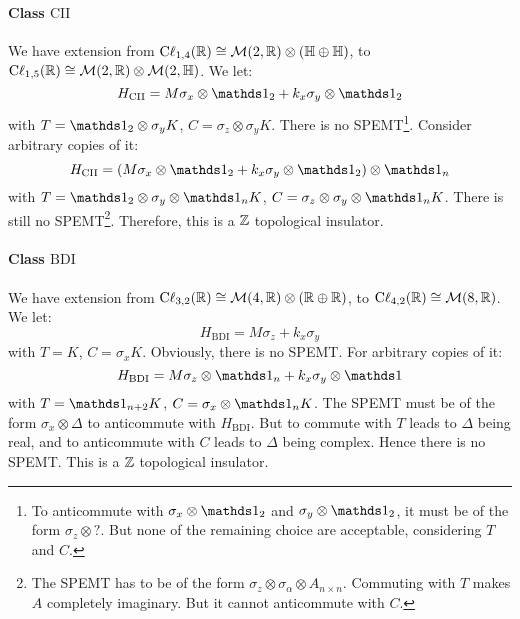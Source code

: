 \documentclass{article}
\begin{document}
\paragraph{Class $\mathrm{CII}$} We have extension from
$\mathrm{C\ell}_{1,4}(\mathbb{R})\cong\mathcal{M}(2,\mathbb{R})\otimes(\mathbb{H}\oplus\mathbb{H})$,
to
$\mathrm{C\ell}_{1,5}(\mathbb{R})\cong\mathcal{M}(2,\mathbb{R})\otimes\mathcal{M}(2,\mathbb{H})$.
We let:
\begin{equation}
    H_{\mathrm{CII}} = M\sigma_x\otimes\id_2 + k_x\sigma_y\otimes\id_2
\end{equation}
with $T=\id_2\otimes\sigma_y K$, $C=\sigma_z\otimes\sigma_y K$. There is no
SPEMT\footnote{To anticommute with $\sigma_x\otimes\id_2$ and
$\sigma_y\otimes\id_2$, it must be of the form $\sigma_z\otimes?$. But none of
the remaining choice are acceptable, considering $T$ and $C$.}. Consider
arbitrary copies of it:
\begin{equation}
    H_{\mathrm{CII}} = (M\sigma_x\otimes\id_2 +
    k_x\sigma_y\otimes\id_2)\otimes\id_n
\end{equation}
with $T=\id_2\otimes\sigma_y\otimes\id_n K$,
$C=\sigma_z\otimes\sigma_y\otimes\id_n K$. There is still no SPEMT\footnote{The
SPEMT has to be of the form $\sigma_z\otimes\sigma_\alpha\otimes A_{n\times n}$.
Commuting with $T$ makes $A$ completely imaginary. But it cannot anticommute
with $C$.}. Therefore, this is a $\mathbb{Z}$ topological insulator.

\paragraph{Class $\mathrm{BDI}$} We have extension from
$\mathrm{C\ell}_{3,2}(\mathbb{R})\cong\mathcal{M}(4,\mathbb{R})\otimes(\mathbb{R}\oplus\mathbb{R})$, to
$\mathrm{C\ell}_{4,2}(\mathbb{R})\cong\mathcal{M}(8,\mathbb{R})$. We let:
\begin{equation}
    H_{\mathrm{BDI}} = M\sigma_z + k_x \sigma_y
\end{equation}
with $T=K$, $C=\sigma_x K$. Obviously, there is no SPEMT. For arbitrary copies
of it:
\begin{equation}
    H_{\mathrm{BDI}} = M\sigma_z\otimes\id_n + k_x \sigma_y\otimes\id
\end{equation}
with $T=\id_{n+2}K$, $C=\sigma_x\otimes\id_n K$.  The SPEMT must be of the form
$\sigma_x\otimes\Delta$ to anticommute with $H_{\mathrm{BDI}}$. But to commute with
$T$ leads to $\Delta$ being real, and to anticommute with $C$ leads to $\Delta$ being
complex. Hence there is no SPEMT. This is a $\mathbb{Z}$ topological insulator.
\end{document}
